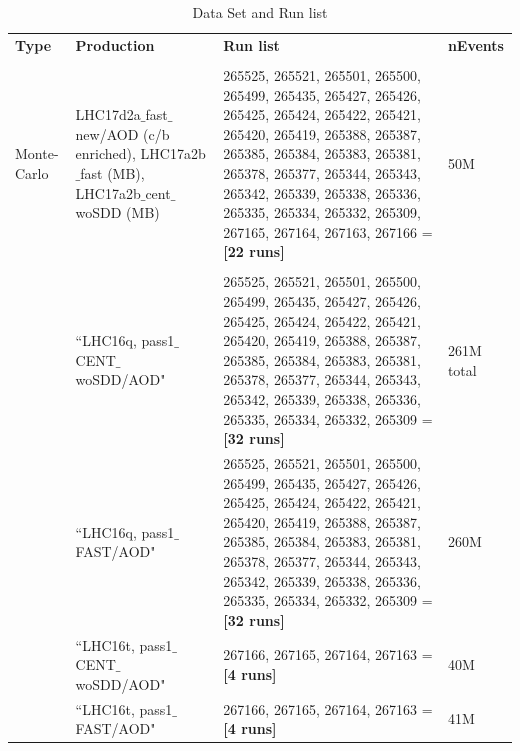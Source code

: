 \vspace{10 mm}
\begin{table}[h]
\begin{tabular}{ p{1.2cm} | p{4.2cm} |  p{7cm} |  p{1.2cm}}
{\normalsize \textbf {Type}} &       {\normalsize \textbf {Production}} &       {\normalsize \textbf {Run list}} & {\normalsize \textbf {nEvents}} \\
\\ \hline
Monte-Carlo & LHC17d2a$\_$fast$\_$new/AOD (c/b enriched), LHC17a2b$\_$fast (MB), LHC17a2b$\_$cent$\_$woSDD (MB) &265525, 265521, 265501, 265500, 265499, 265435, 265427, 265426, 265425, 265424, 265422, 265421, 265420, 265419, 265388, 265387, 265385, 265384, 265383, 265381, 265378, 265377, 265344, 265343, 265342, 265339, 265338, 265336, 265335, 265334, 265332, 265309, 267165, 267164, 267163, 267166 = \textbf{[22 runs]} & 50M\\
\\ \hline

\multirow{7}{*}{} Data&``LHC16q, pass1$\_$CENT$\_$woSDD/AOD" & 265525, 265521, 265501, 265500, 265499, 265435, 265427, 265426, 265425, 265424, 265422, 265421, 265420, 265419, 265388, 265387, 265385, 265384, 265383, 265381, 265378, 265377, 265344, 265343, 265342, 265339, 265338, 265336, 265335, 265334, 265332, 265309 = \textbf{[32 runs]}& 261M total\\
                  &``LHC16q, pass1$\_$FAST/AOD" &265525, 265521, 265501, 265500, 265499, 265435, 265427, 265426, 265425, 265424, 265422, 265421, 265420, 265419, 265388, 265387, 265385, 265384, 265383, 265381, 265378, 265377, 265344, 265343, 265342, 265339, 265338, 265336, 265335, 265334, 265332, 265309 = \textbf{[32 runs]} & 260M \\
 & ``LHC16t, pass1$\_$CENT$\_$woSDD/AOD" & 267166, 267165, 267164, 267163 = \textbf{[4 runs]} & 40M \\
  & ``LHC16t, pass1$\_$FAST/AOD" & 267166, 267165, 267164, 267163 = \textbf{[4 runs]} & 41M \\
 \hline \hline
\end{tabular}
\\
\caption {Data Set and Run list}
\end{table} 

